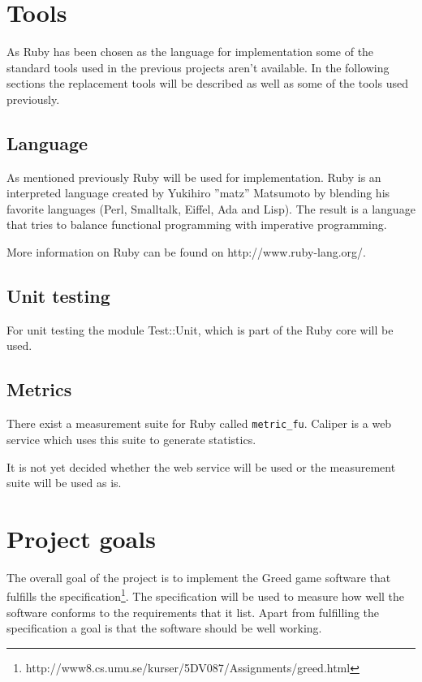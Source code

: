 \documentclass[10pt, titlepage, oneside, a4paper]{article}
\begin{document}
	\section{Tools}

		As Ruby has been chosen as the language for implementation some of the standard tools used in the previous projects aren't available. In the following sections the replacement tools will be described as well as some of the tools used previously.
		
		\subsection{Language}
		
			As mentioned previously Ruby will be used for implementation. Ruby is an interpreted language created by Yukihiro ''matz'' Matsumoto by blending his favorite languages (Perl, Smalltalk, Eiffel, Ada and Lisp). The result is a language that tries to balance functional programming with imperative programming.
			
			More information on Ruby can be found on http://www.ruby-lang.org/.
		
		\subsection{Unit testing}
		
			For unit testing the module Test::Unit, which is part of the Ruby core will be used.
		
		\subsection{Metrics}
		
			There exist a measurement suite for Ruby called {\tt metric\_fu}. Caliper is a web service which uses this suite to generate statistics.
			
			It is not yet decided whether the web service will be used or the measurement suite will be used as is.

	\section{Project goals}

	The overall goal of the project is to implement the Greed game software that fulfills the specification\footnote{http://www8.cs.umu.se/kurser/5DV087/Assignments/greed.html}. The specification will be used to measure how well the software conforms to the requirements that it list. Apart from fulfilling the specification a goal is that the software should be well working.
\end{document}
